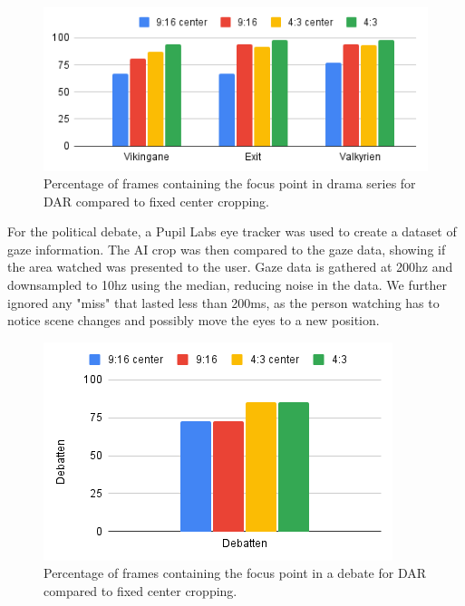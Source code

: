 \documentclass{aircc}
\begin{document}
\begin{figure}
\begin{center}
\includegraphics[width=0.7\columnwidth]{generic_ai_comparison.png}
\caption{Percentage of frames containing the focus point in drama series for DAR compared to fixed center cropping.}
\label{generic_ai_comparison}
\end{center}
\end{figure}

For the political debate, a Pupil Labs eye tracker was used to create a
dataset of gaze information. The AI crop was then compared to the gaze data,
showing if the area watched was presented to the user. Gaze data is gathered
at 200hz and downsampled to 10hz using the median, reducing noise in the
data. We further ignored any "miss" that lasted less than 200ms, as the
person watching has to notice scene changes and possibly move the eyes to a
new position. 

\begin{figure}
\begin{center}
\includegraphics[width=0.7\columnwidth]{CoverageOfEyeTracking.png}
\caption{Percentage of frames containing the focus point in a debate for DAR compared to fixed center cropping.}
\label{debatten_plot}
 \end{center}
\end{figure}
\end{document}
